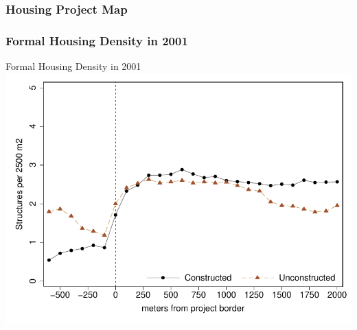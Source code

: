 \documentclass[aspectratio=32]{beamer}
\begin{document}
\begin{frame}
\frametitle{Housing Project Map}
\begin{center}
\begin{figure}
\vspace{-3mm}
\end{figure}
\end{center}
\end{frame}




\begin{frame}
\frametitle{Formal Housing Density in 2001}
\centering
Formal Housing Density in 2001 \\
\vspace{.4cm} 
 \includegraphics[width=.8\textwidth,trim={.4cm .4cm .4cm .4cm}]{figures/bblu/bblu_for_pre_means}\hspace{.5cm}

\end{frame}
\end{document}
